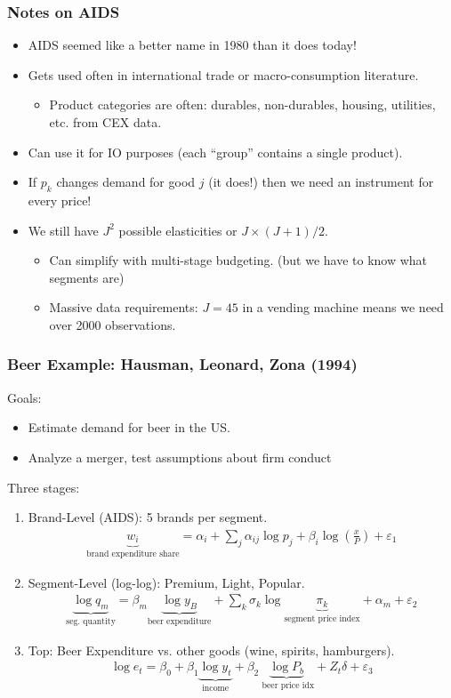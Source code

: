 \documentclass[aspectratio=169,11pt]{beamer}
\begin{document}
\begin{frame}
\frametitle{Notes on AIDS}
\begin{itemize}
\item AIDS seemed like a better name in 1980 than it does today!
\item Gets used often in international trade or macro-consumption literature.
\begin{itemize}
\item Product categories are often: durables, non-durables, housing, utilities, etc. from CEX data.
\end{itemize}
\item Can use it for IO purposes (each ``group'' contains a single product).
\item If $p_k$ changes demand for good $j$ (it does!) then we need an instrument for every price!
\item We still have $J^2$ possible elasticities or $J \times (J+1)/2$.
\begin{itemize}
\item Can simplify with multi-stage budgeting. (but we have to know what segments are)
\item Massive data requirements: $J=45$ in a vending machine means we need over 2000 observations.
\end{itemize}
\end{itemize}
\end{frame}

\begin{frame}
\frametitle{Beer Example: Hausman, Leonard, Zona (1994)}
\small
Goals:
\begin{itemize}
\item Estimate demand for beer in the US.
\item Analyze a merger, test assumptions about firm conduct
\end{itemize}
Three stages:
\begin{enumerate}
\item Brand-Level (AIDS): 5 brands per segment.
\begin{eqnarray*}
\underbrace{w_i}_{\text{brand expenditure share}} = \alpha_i + \sum_j \alpha_{ij} \log p_j + \beta_i \log \left(\frac{x}{P} \right) + \varepsilon_1
\end{eqnarray*}
\item Segment-Level (log-log): Premium, Light, Popular.
\begin{eqnarray*}
\underbrace{\log q_m}_{\text{seg. quantity}} = \beta_m \underbrace{\log y_B}_{ \text{beer expenditure}} + \sum_k \sigma_k \log \underbrace{\pi_k}_{\text{segment price index}} + \alpha_m + \varepsilon_2
\end{eqnarray*}
\item Top: Beer Expenditure  vs. other goods (wine, spirits, hamburgers).
\begin{eqnarray*}
\log e_t = \beta_0 + \beta_1 \underbrace{\log y_t}_{\text{income}} + \beta_2 \underbrace{\log P_b}_{\text{ beer price idx}} + Z_t \delta + \varepsilon_3
\end{eqnarray*}
\end{enumerate}
\end{frame}
\end{document}
